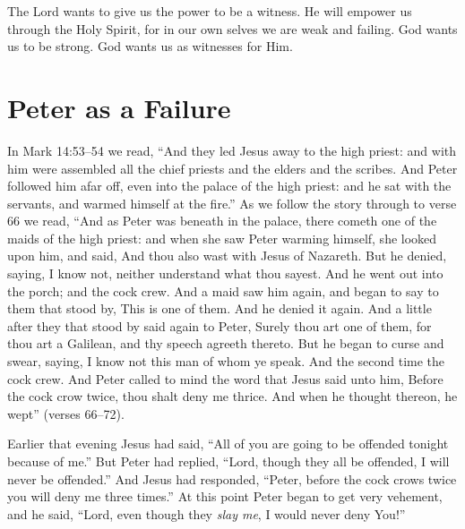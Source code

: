 The Lord wants to give us the power to be a witness.
He will empower us through the Holy Spirit, for in our own
selves we are weak and failing. God wants us to be strong.
God wants us as witnesses for Him.


\section*{Peter as a Failure}

In Mark 14:53–54 we read, “And they led Jesus away to
the high priest: and with him were assembled all the chief
priests and the elders and the scribes. And Peter followed
him afar off, even into the palace of the high priest: and he
sat with the servants, and warmed himself at the fire.” As
we follow the story through to verse 66 we read, “And as
Peter was beneath in the palace, there cometh one of the
maids of the high priest: and when she saw Peter warming
himself, she looked upon him, and said, And thou also wast
with Jesus of Nazareth. But he denied, saying, I know not,
neither understand what thou sayest. And he went out into
the porch; and the cock crew. And a maid saw him again,
and began to say to them that stood by, This is one of them.
And he denied it again. And a little after they that stood by
said again to Peter, Surely thou art one of them, for thou
art a Galilean, and thy speech agreeth thereto. But he began
to curse and swear, saying, I know not this man of whom
ye speak. And the second time the cock crew. And Peter
called to mind the word that Jesus said unto him, Before the
cock crow twice, thou shalt deny me thrice. And when he
thought thereon, he wept” (verses 66–72).

Earlier that evening Jesus had said, “All of you are
going to be offended tonight because of me.” But Peter had
replied, “Lord, though they all be offended, I will never
be offended.” And Jesus had responded, “Peter, before the
cock crows twice you will deny me three times.” At this
point Peter began to get very vehement, and he said, “Lord,
even though they \emph{slay me}, I would never deny You!”

